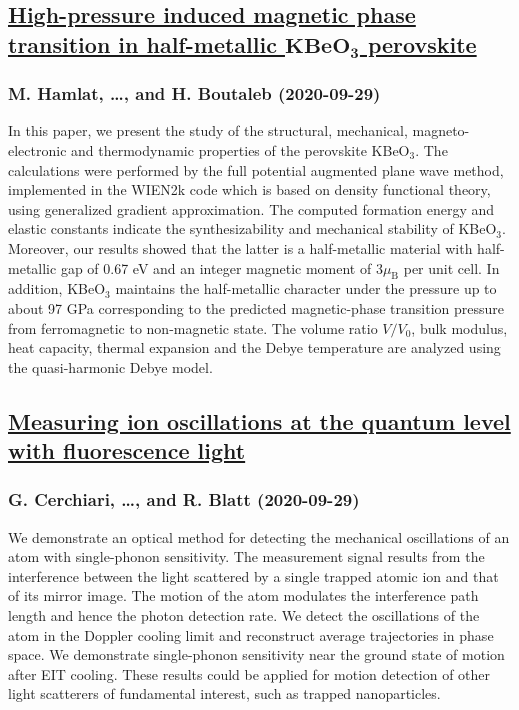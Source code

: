 \subsection*{\href{http://arxiv.org/abs/2009.14107v1}{High-pressure induced magnetic phase transition in half-metallic  $\textbf{KBeO}_\textbf{3}$ perovskite}}
\subsubsection*{M. Hamlat, \dots, and H. Boutaleb (2020-09-29)}
In this paper, we present the study of the structural, mechanical,
magneto-electronic and thermodynamic properties of the perovskite KBeO$_3$. The
calculations were performed by the full potential augmented plane wave method,
implemented in the WIEN2k code which is based on density functional theory,
using generalized gradient approximation. The computed formation energy and
elastic constants indicate the synthesizability and mechanical stability of
KBeO$_3$. Moreover, our results showed that the latter is a half-metallic
material with half-metallic gap of 0.67 eV and an integer magnetic moment of
3$\mu_{\text{B}}$ per unit cell. In addition, KBeO$_3$ maintains the
half-metallic character under the pressure up to about 97 GPa corresponding to
the predicted magnetic-phase transition pressure from ferromagnetic to
non-magnetic state. The volume ratio $V/V_{0}$, bulk modulus, heat capacity,
thermal expansion and the Debye temperature are analyzed using the
quasi-harmonic Debye model.

\subsection*{\href{http://arxiv.org/abs/2009.14098v1}{Measuring ion oscillations at the quantum level with fluorescence light}}
\subsubsection*{G. Cerchiari, \dots, and R. Blatt (2020-09-29)}
We demonstrate an optical method for detecting the mechanical oscillations of
an atom with single-phonon sensitivity. The measurement signal results from the
interference between the light scattered by a single trapped atomic ion and
that of its mirror image. The motion of the atom modulates the interference
path length and hence the photon detection rate. We detect the oscillations of
the atom in the Doppler cooling limit and reconstruct average trajectories in
phase space. We demonstrate single-phonon sensitivity near the ground state of
motion after EIT cooling. These results could be applied for motion detection
of other light scatterers of fundamental interest, such as trapped
nanoparticles.

